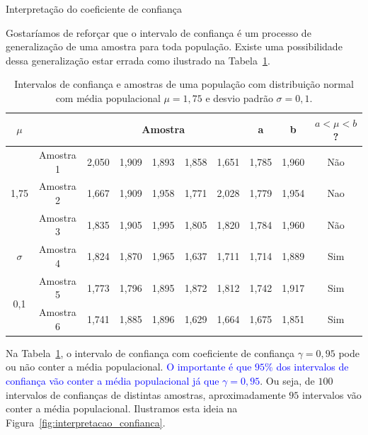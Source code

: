 \documentclass[8pt]{beamer}
\begin{document}
\begin{frame}{Interpretação do coeficiente de confiança}

Gostaríamos de reforçar que o intervalo de confiança é um processo de generalização de uma amostra para toda população. Existe uma possibilidade dessa generalização estar errada como ilustrado na Tabela~\ref{fig:confianca}.



\scriptsize
\begin{table}[htbp]
	\caption{Intervalos de confiança e amostras de uma população com distribuição normal com média populacional $\mu=1,75$ e desvio padrão $\sigma=0,1$.}
	\begin{tabular}{|c|c|r|r|r|r|r|r|r|c|}
		\hline
		\multicolumn{1}{|c|}{$\mu$} &  & \multicolumn{ 5}{c|}{Amostra} & \multicolumn{1}{c|}{a} & \multicolumn{1}{c|}{b} & $a < \mu < b$? \\ \hline
		\multirow{3}{*}{1,75} & Amostra 1 & 2,050 & 1,909 & 1,893 & 1,858 & 1,651 & 1,785 & 1,960 & Não \\ \cline{ 2- 10}
 & Amostra 2 & 1,667 & 1,909 & 1,958 & 1,771 & 2,028 & 1,779 & 1,954 & Nao \\ \cline{ 2- 10}
 & Amostra 3 & 1,835 & 1,905 & 1,995 & 1,805 & 1,820 & 1,784 & 1,960 & Não \\ \hline
		\multicolumn{1}{|c|}{$\sigma$} & Amostra 4 & 1,824 & 1,870 & 1,965 & 1,637 & 1,711 & 1,714 & 1,889 & Sim \\ \hline
		\multirow{2}{*}{0,1} & Amostra 5 & 1,773 & 1,796 & 1,895 & 1,872 & 1,812 & 1,742 & 1,917 & Sim \\ \cline{ 2- 10}
 & Amostra 6 & 1,741 & 1,885 & 1,896 & 1,629 & 1,664 & 1,675 & 1,851 & Sim \\ \hline
	\end{tabular}
	\label{fig:confianca}
\end{table}


\normalsize



Na Tabela~\ref{fig:confianca}, o intervalo de confiança com coeficiente de confiança $\gamma=0,95$ pode ou não conter a média populacional. \textcolor{blue}{ O importante é que $95\%$ dos intervalos de confiança vão conter a média populacional já que $\gamma = 0,95$}. Ou seja, de $100$ intervalos de confianças de distintas amostras, aproximadamente $95$ intervalos vão conter a média populacional. Ilustramos esta ideia na Figura~\ref{fig:interpretacao_confianca}.
 \end{frame}
\end{document}
